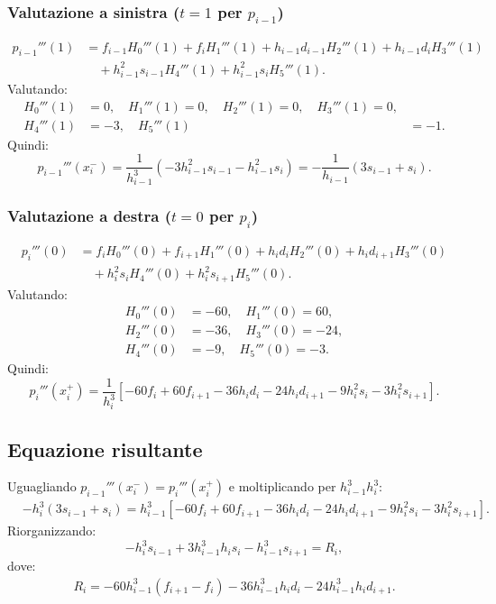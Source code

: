 \documentclass[12pt]{article}
\begin{document}
\subsubsection{Valutazione a sinistra ($t=1$ per $p_{i-1}$)}
\[
\begin{aligned}
p_{i-1}'''(1) &= f_{i-1} H_0'''(1) + f_i H_1'''(1) + h_{i-1} d_{i-1} H_2'''(1) + h_{i-1} d_i H_3'''(1) \\
&\quad + h_{i-1}^2 s_{i-1} H_4'''(1) + h_{i-1}^2 s_i H_5'''(1).
\end{aligned}
\]
Valutando:
\[
\begin{aligned}
H_0'''(1) &= 0, \quad H_1'''(1) = 0, \quad H_2'''(1) = 0, \quad H_3'''(1) = 0, \\
H_4'''(1) &= -3, \quad H_5'''(1) &= -1.
\end{aligned}
\]
Quindi:
\[
p_{i-1}'''(x_i^-) = \frac{1}{h_{i-1}^3} \left(-3 h_{i-1}^2 s_{i-1} - h_{i-1}^2 s_i\right) = -\frac{1}{h_{i-1}}(3s_{i-1} + s_i).
\]

\subsubsection{Valutazione a destra ($t=0$ per $p_i$)}
\[
\begin{aligned}
p_i'''(0) &= f_i H_0'''(0) + f_{i+1} H_1'''(0) + h_i d_i H_2'''(0) + h_i d_{i+1} H_3'''(0) \\
&\quad + h_i^2 s_i H_4'''(0) + h_i^2 s_{i+1} H_5'''(0).
\end{aligned}
\]
Valutando:
\[
\begin{aligned}
H_0'''(0) &= -60, \quad H_1'''(0) = 60, \\
H_2'''(0) &= -36, \quad H_3'''(0) = -24, \\
H_4'''(0) &= -9, \quad H_5'''(0) = -3.
\end{aligned}
\]
Quindi:
\[
p_i'''(x_i^+) = \frac{1}{h_i^3} \left[ -60f_i + 60f_{i+1} - 36h_i d_i - 24h_i d_{i+1} - 9h_i^2 s_i - 3h_i^2 s_{i+1} \right].
\]

\subsection{Equazione risultante}
Uguagliando $p_{i-1}'''(x_i^-) = p_i'''(x_i^+)$ e moltiplicando per $h_{i-1}^3 h_i^3$:
\[
\begin{aligned}
&-h_i^3(3s_{i-1} + s_i) = h_{i-1}^3 \left[ -60f_i + 60f_{i+1} - 36h_i d_i - 24h_i d_{i+1} - 9h_i^2 s_i - 3h_i^2 s_{i+1} \right].
\end{aligned}
\]
Riorganizzando:
\[
- h_i^3 s_{i-1} + 3h_{i-1}^3 h_i s_i - h_{i-1}^3 s_{i+1} = R_i,
\]
dove:
\[
\begin{aligned}
R_i = -60h_{i-1}^3(f_{i+1} - f_i) - 36h_{i-1}^3 h_i d_i - 24h_{i-1}^3 h_i d_{i+1}.
\end{aligned}
\]
\end{document}
